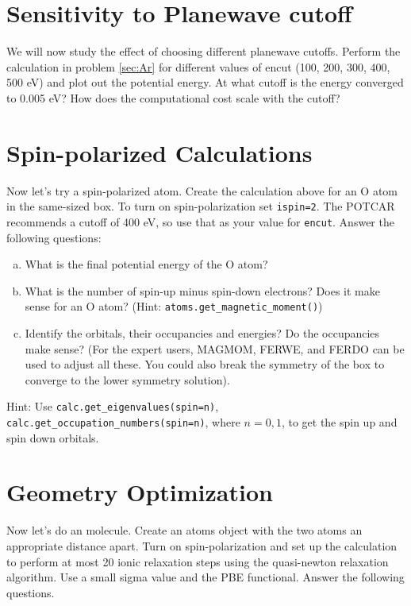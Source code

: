 \documentclass[11pt]{article}
\begin{document}
\section{Sensitivity to Planewave cutoff}
\label{sec:orgf657017}
We will now study the effect of choosing different planewave cutoffs. Perform the calculation in problem \ref{sec:Ar} for different values of encut (100, 200, 300, 400, 500 eV) and plot out the potential energy. At what cutoff is the energy converged to 0.005 eV? How does the computational cost scale with the cutoff?
\section{Spin-polarized Calculations}
\label{sec:orgdb93237}
Now let’s try a spin-polarized atom. Create the calculation above for an O atom in the same-sized box. To turn on spin-polarization set \texttt{ispin=2}. The POTCAR recommends a cutoff of 400 eV, so use that as your value for \texttt{encut}. Answer the following questions:

\begin{enumerate}[(a)]
\item What is the final potential energy of the O atom?

\item What is the number of spin-up minus spin-down electrons? Does it make sense for an O atom? (Hint: \texttt{atoms.get\_magnetic\_moment()})

\item Identify the orbitals, their occupancies and energies? Do the occupancies make sense? (For the expert users, MAGMOM, FERWE, and FERDO can be used to adjust all these. You could also break the symmetry of the box to converge to the lower symmetry solution).
\end{enumerate}

Hint: Use \texttt{calc.get\_eigenvalues(spin=n)}, \texttt{calc.get\_occupation\_numbers(spin=n)}, where \(n=0,1\), to get the spin up and spin down orbitals.

\section{Geometry Optimization}
\label{sec:orge235eac}
Now let’s do an  molecule. Create an atoms object with the two atoms an appropriate distance apart. Turn on spin-polarization and set up the calculation to perform at most 20 ionic relaxation steps using the quasi-newton relaxation algorithm. Use a small sigma value and the PBE functional. Answer the following questions.
\end{document}
